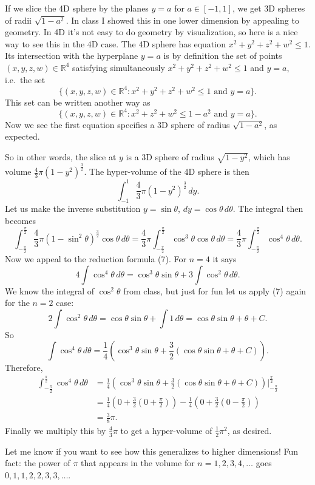 \documentclass[11pt,oneside]{amsart}
\theoremstyle{definition}
\newcommand{\bR}{\mathbb{R}}
\begin{document}
    \begin{solution}
        If we slice the 4D sphere by the planes $y=a$ for $a\in [-1,1]$, we get 3D spheres of radii $\sqrt{1-a^2}$. In class I showed this in one lower dimension by appealing to geometry. In 4D it's not easy to do geometry by visualization, so here is a nice way to see this in the 4D case. The 4D sphere has equation $x^2+y^2+z^2+w^2\leq 1$. Its intersection with the hyperplane $y=a$ is by definition the set of points $(x,y,z,w)\in\bR^4$ satisfying simultaneously $x^2+y^2+z^2+w^2\leq 1$ and $y=a$, i.e.\ the set
        \[\{(x,y,z,w)\in\bR^4:x^2+y^2+z^2+w^2\leq 1\text{ and }y=a\}.\]
        This set can be written another way as
        \[\{(x,y,z,w)\in\bR^4:x^2+z^2+w^2\leq 1-a^2\text{ and }y=a\}.\]
        Now we see the first equation specifies a 3D sphere of radius $\sqrt{1-a^2}$, as expected.

        So in other words, the slice at $y$ is a 3D sphere of radius $\sqrt{1-y^2}$, which has volume $\frac 43\pi (1-y^2)^{\frac 32}$. The hyper-volume of the 4D sphere is then
        \[\int_{-1}^1\frac 43\pi(1-y^2)^{\frac 32}\,dy.\]
        Let us make the inverse substitution $y=\sin\theta$, $dy=\cos\theta\,d\theta$. The integral then becomes
        \[\int_{-\frac{\pi}2}^{\frac{\pi}2}\frac 43\pi (1-\sin^2\theta)^{\frac 32}\cos\theta\,d\theta=\frac 43\pi\int_{-\frac{\pi}2}^{\frac{\pi}2} \cos^3\theta\cos\theta\,d\theta=\frac 43\pi\int_{-\frac{\pi}2}^{\frac{\pi}2} \cos^4\theta\,d\theta.\]
        Now we appeal to the reduction formula (7). For $n=4$ it says
        \[4\int\cos^4 \theta\,d\theta=\cos^3\theta\sin\theta+3\int\cos^2\theta\,d\theta.\]
        We know the integral of $\cos^2\theta$ from class, but just for fun let us apply (7) again for the $n=2$ case:
        \[2\int\cos^2\theta\,d\theta=\cos\theta\sin\theta+\int 1\,d\theta=\cos\theta\sin\theta+\theta+C.\]
        So
        \[\int\cos^4\theta\,d\theta=\frac 14\left(\cos^3\theta\sin\theta+\frac 32(\cos\theta\sin\theta+\theta+C)\right).\]
        Therefore,
        \[\begin{split}
            \int_{-\frac{\pi}2}^{\frac{\pi}2}\cos^4\theta\,d\theta &= \frac 14\left(\cos^3\theta\sin\theta+\frac 32(\cos\theta\sin\theta+\theta+C)\right)\Big|_{-\frac{\pi}2}^{\frac{\pi}2}\\
            &= \frac14\left(0+\frac 32\left(0+\frac{\pi}2\right)\right)-\frac 14\left(0+\frac 32\left(0-\frac{\pi}2\right)\right)\\
            &= \frac 38\pi.
        \end{split}\]
        Finally we multiply this by $\frac 43\pi$ to get a hyper-volume of $\frac 12\pi^2$, as desired.

        Let me know if you want to see how this generalizes to higher dimensions! Fun fact: the power of $\pi$ that appears in the volume for $n=1,2,3,4,\dots$ goes $0,1,1,2,2,3,3,\dots$.
    \end{solution}
\end{document}
